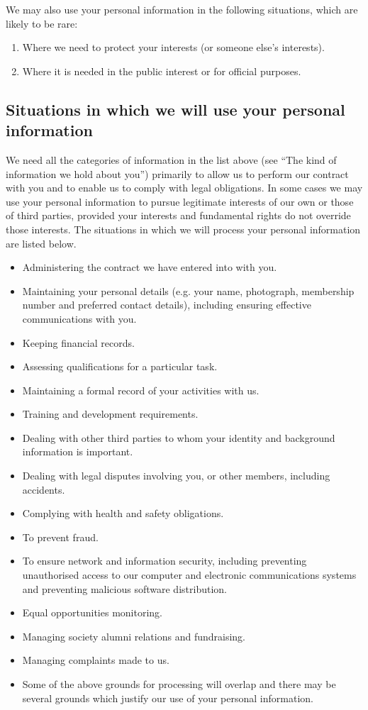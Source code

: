 \documentclass[12pt]{article}
\begin{document}
We may also use your personal information in the following situations, which are likely to be rare:

\begin{enumerate}
\item Where we need to protect your interests (or someone else's interests).
\item Where it is needed in the public interest or for official purposes.
\end{enumerate}

\subsection{Situations in which we will use your personal information}

We need all the categories of information in the list above (see “The kind of information we hold about you”) primarily to allow us to perform our contract with you and to enable us to comply with legal obligations. In some cases we may use your personal information to pursue legitimate interests of our own or those of third parties, provided your interests and fundamental rights do not override those interests. The situations in which we will process your personal information are listed below. 

\begin{itemize}
\item Administering the contract we have entered into with you.
\item Maintaining your personal details (e.g. your name, photograph, membership number and preferred contact details), including ensuring effective communications with you.
\item Keeping financial records.
\item Assessing qualifications for a particular task.
\item Maintaining a formal record of your activities with us.
\item Training and development requirements.
\item Dealing with other third parties to whom your identity and background information is important. 
\item Dealing with legal disputes involving you, or other members, including accidents.
\item Complying with health and safety obligations.
\item To prevent fraud.
\item To ensure network and information security, including preventing unauthorised access to our computer and electronic communications systems and preventing malicious software distribution.
\item Equal opportunities monitoring.
\item Managing society alumni relations and fundraising.
\item Managing complaints made to us.
\item Some of the above grounds for processing will overlap and there may be several grounds which justify our use of your personal information. 
\end{itemize}
\end{document}
